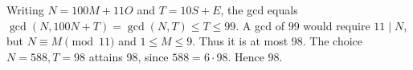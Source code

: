Writing $N=100M+11O$ and $T=10S+E$, the gcd equals $\gcd(N,100N+T)=\gcd(N,T)\le T\le99$. A gcd of 99 would require $11\mid N$, but $N\equiv M\pmod{11}$ and $1\le M\le9$. Thus it is at most 98. The choice $N=588,T=98$ attains 98, since $588=6\cdot98$. Hence $\boxed{98}$.
